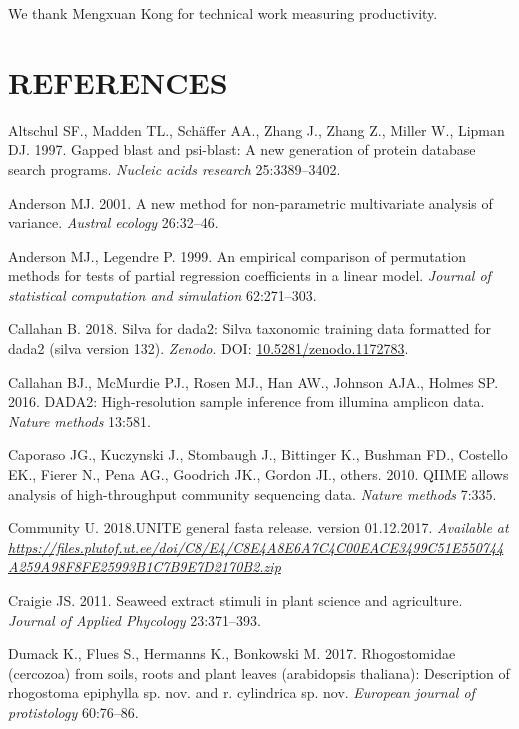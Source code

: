 \documentclass[11pt,]{article}
\begin{document}
We thank Mengxuan Kong for technical work measuring productivity.

\newpage  

\section*{REFERENCES}\label{references}

\hypertarget{refs}{}
\hypertarget{ref-altschul1997gapped}{}
Altschul SF., Madden TL., Schäffer AA., Zhang J., Zhang Z., Miller W.,
Lipman DJ. 1997. Gapped blast and psi-blast: A new generation of protein
database search programs. \emph{Nucleic acids research} 25:3389--3402.

\hypertarget{ref-anderson2001new}{}
Anderson MJ. 2001. A new method for non-parametric multivariate analysis
of variance. \emph{Austral ecology} 26:32--46.

\hypertarget{ref-anderson1999empirical}{}
Anderson MJ., Legendre P. 1999. An empirical comparison of permutation
methods for tests of partial regression coefficients in a linear model.
\emph{Journal of statistical computation and simulation} 62:271--303.

\hypertarget{ref-silva}{}
Callahan B. 2018. Silva for dada2: Silva taxonomic training data
formatted for dada2 (silva version 132). \emph{Zenodo}. DOI:
\href{https://doi.org/10.5281/zenodo.1172783}{10.5281/zenodo.1172783}.

\hypertarget{ref-callahan2016dada2}{}
Callahan BJ., McMurdie PJ., Rosen MJ., Han AW., Johnson AJA., Holmes SP.
2016. DADA2: High-resolution sample inference from illumina amplicon
data. \emph{Nature methods} 13:581.

\hypertarget{ref-caporaso2010qiime}{}
Caporaso JG., Kuczynski J., Stombaugh J., Bittinger K., Bushman FD.,
Costello EK., Fierer N., Pena AG., Goodrich JK., Gordon JI., others.
2010. QIIME allows analysis of high-throughput community sequencing
data. \emph{Nature methods} 7:335.

\hypertarget{ref-UNITE2017}{}
Community U. 2018.UNITE general fasta release. version 01.12.2017.
\emph{Available at}
\emph{\url{https://files.plutof.ut.ee/doi/C8/E4/C8E4A8E6A7C4C00EACE3499C51E550744A259A98F8FE25993B1C7B9E7D2170B2.zip}}

\hypertarget{ref-craigie2011seaweed}{}
Craigie JS. 2011. Seaweed extract stimuli in plant science and
agriculture. \emph{Journal of Applied Phycology} 23:371--393.

\hypertarget{ref-dumack2017rhogostomidae}{}
Dumack K., Flues S., Hermanns K., Bonkowski M. 2017. Rhogostomidae
(cercozoa) from soils, roots and plant leaves (arabidopsis thaliana):
Description of rhogostoma epiphylla sp. nov. and r. cylindrica sp. nov.
\emph{European journal of protistology} 60:76--86.
\end{document}
